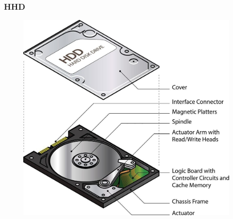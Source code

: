\begin{frame}
	\frametitle{HHD}
	  
	\begin{figure}[!htbp]
		\centering 
		\includegraphics[width=0.62\linewidth]{images/5_memory/hdd_info_1.jpg}
		\label{fig:memory_hdd_info_1}
	\end{figure}
\end{frame}




